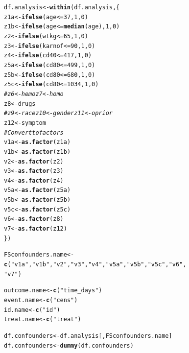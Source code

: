 \documentclass[9pt]{article}\usepackage[]{graphicx}\usepackage[]{xcolor}
\makeatletter
\newcommand{\hlnum}[1]{\textcolor[rgb]{0.686,0.059,0.569}{#1}}%
\newcommand{\hlstr}[1]{\textcolor[rgb]{0.192,0.494,0.8}{#1}}%
\newcommand{\hlcom}[1]{\textcolor[rgb]{0.678,0.584,0.686}{\textit{#1}}}%
\newcommand{\hlopt}[1]{\textcolor[rgb]{0,0,0}{#1}}%
\newcommand{\hlstd}[1]{\textcolor[rgb]{0.345,0.345,0.345}{#1}}%
\newcommand{\hlkwb}[1]{\textcolor[rgb]{0.69,0.353,0.396}{#1}}%
\newcommand{\hlkwd}[1]{\textcolor[rgb]{0.737,0.353,0.396}{\textbf{#1}}}%
\newenvironment{kframe}{%
 \def\at@end@of@kframe{}%
 \ifinner\ifhmode%
  \def\at@end@of@kframe{\end{minipage}}%
  \begin{minipage}{\columnwidth}%
 \fi\fi%
 \def\FrameCommand##1{\hskip\@totalleftmargin \hskip-\fboxsep
 \colorbox{shadecolor}{##1}\hskip-\fboxsep
     \hskip-\linewidth \hskip-\@totalleftmargin \hskip\columnwidth}%
 \MakeFramed {\advance\hsize-\width
   \@totalleftmargin\z@ \linewidth\hsize
   \@setminipage}}%
 {\par\unskip\endMakeFramed%
 \at@end@of@kframe}
\newenvironment{knitrout}{}{} %
\theoremstyle{definition}
\theoremstyle{remark}
\makeatother
\begin{document}
\begin{knitrout}
\begin{kframe}
\begin{alltt}
\hlstd{df.analysis} \hlkwb{<-} \hlkwd{within}\hlstd{(df.analysis, \{}
    \hlstd{z1a} \hlkwb{<-} \hlkwd{ifelse}\hlstd{(age} \hlopt{<=} \hlnum{37}\hlstd{,} \hlnum{1}\hlstd{,} \hlnum{0}\hlstd{)}
    \hlstd{z1b} \hlkwb{<-} \hlkwd{ifelse}\hlstd{(age} \hlopt{<=} \hlkwd{median}\hlstd{(age),} \hlnum{1}\hlstd{,} \hlnum{0}\hlstd{)}
    \hlstd{z2} \hlkwb{<-} \hlkwd{ifelse}\hlstd{(wtkg} \hlopt{<=} \hlnum{65}\hlstd{,} \hlnum{1}\hlstd{,} \hlnum{0}\hlstd{)}
    \hlstd{z3} \hlkwb{<-} \hlkwd{ifelse}\hlstd{(karnof} \hlopt{<=} \hlnum{90}\hlstd{,} \hlnum{1}\hlstd{,} \hlnum{0}\hlstd{)}
    \hlstd{z4} \hlkwb{<-} \hlkwd{ifelse}\hlstd{(cd40} \hlopt{<=} \hlnum{417}\hlstd{,} \hlnum{1}\hlstd{,} \hlnum{0}\hlstd{)}
    \hlstd{z5a} \hlkwb{<-} \hlkwd{ifelse}\hlstd{(cd80} \hlopt{<=} \hlnum{499}\hlstd{,} \hlnum{1}\hlstd{,} \hlnum{0}\hlstd{)}
    \hlstd{z5b} \hlkwb{<-} \hlkwd{ifelse}\hlstd{(cd80} \hlopt{<=} \hlnum{680}\hlstd{,} \hlnum{1}\hlstd{,} \hlnum{0}\hlstd{)}
    \hlstd{z5c} \hlkwb{<-} \hlkwd{ifelse}\hlstd{(cd80} \hlopt{<=} \hlnum{1034}\hlstd{,} \hlnum{1}\hlstd{,} \hlnum{0}\hlstd{)}
    \hlcom{# z6<-hemo z7<-homo}
    \hlstd{z8} \hlkwb{<-} \hlstd{drugs}
    \hlcom{# z9<-race z10<-gender z11<-oprior}
    \hlstd{z12} \hlkwb{<-} \hlstd{symptom}
    \hlcom{# Convert to factors}
    \hlstd{v1a} \hlkwb{<-} \hlkwd{as.factor}\hlstd{(z1a)}
    \hlstd{v1b} \hlkwb{<-} \hlkwd{as.factor}\hlstd{(z1b)}
    \hlstd{v2} \hlkwb{<-} \hlkwd{as.factor}\hlstd{(z2)}
    \hlstd{v3} \hlkwb{<-} \hlkwd{as.factor}\hlstd{(z3)}
    \hlstd{v4} \hlkwb{<-} \hlkwd{as.factor}\hlstd{(z4)}
    \hlstd{v5a} \hlkwb{<-} \hlkwd{as.factor}\hlstd{(z5a)}
    \hlstd{v5b} \hlkwb{<-} \hlkwd{as.factor}\hlstd{(z5b)}
    \hlstd{v5c} \hlkwb{<-} \hlkwd{as.factor}\hlstd{(z5c)}
    \hlstd{v6} \hlkwb{<-} \hlkwd{as.factor}\hlstd{(z8)}
    \hlstd{v7} \hlkwb{<-} \hlkwd{as.factor}\hlstd{(z12)}
\hlstd{\})}

\hlstd{FSconfounders.name} \hlkwb{<-} \hlkwd{c}\hlstd{(}\hlstr{"v1a"}\hlstd{,} \hlstr{"v1b"}\hlstd{,} \hlstr{"v2"}\hlstd{,} \hlstr{"v3"}\hlstd{,} \hlstr{"v4"}\hlstd{,} \hlstr{"v5a"}\hlstd{,} \hlstr{"v5b"}\hlstd{,} \hlstr{"v5c"}\hlstd{,} \hlstr{"v6"}\hlstd{,}
    \hlstr{"v7"}\hlstd{)}

\hlstd{outcome.name} \hlkwb{<-} \hlkwd{c}\hlstd{(}\hlstr{"time_days"}\hlstd{)}
\hlstd{event.name} \hlkwb{<-} \hlkwd{c}\hlstd{(}\hlstr{"cens"}\hlstd{)}
\hlstd{id.name} \hlkwb{<-} \hlkwd{c}\hlstd{(}\hlstr{"id"}\hlstd{)}
\hlstd{treat.name} \hlkwb{<-} \hlkwd{c}\hlstd{(}\hlstr{"treat"}\hlstd{)}

\hlstd{df.confounders} \hlkwb{<-} \hlstd{df.analysis[, FSconfounders.name]}
\hlstd{df.confounders} \hlkwb{<-} \hlkwd{dummy}\hlstd{(df.confounders)}


\end{alltt}
\end{kframe}
\end{knitrout}
\end{document}
